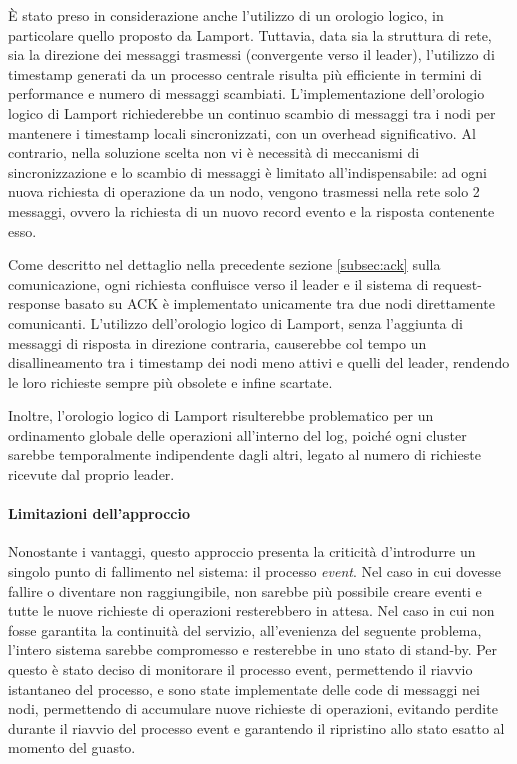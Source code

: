 \documentclass[12pt, a4paper]{report}
\begin{document}
\`E stato preso in considerazione anche l'utilizzo di un orologio logico, in particolare quello proposto da Lamport. Tuttavia, data sia la struttura di rete, sia la direzione dei messaggi trasmessi (convergente verso il leader), l'utilizzo di timestamp generati da un processo centrale risulta pi\`u efficiente in termini di performance e numero di messaggi scambiati. L'implementazione dell'orologio logico di Lamport richiederebbe un continuo scambio di messaggi tra i nodi per mantenere i timestamp locali sincronizzati, con un overhead significativo. Al contrario, nella soluzione scelta non vi \`e necessit\`a di meccanismi di sincronizzazione e lo scambio di messaggi \`e limitato all'indispensabile: ad ogni nuova richiesta di operazione da un nodo, vengono trasmessi nella rete solo 2 messaggi, ovvero la richiesta di un nuovo record evento e la risposta contenente esso.

Come descritto nel dettaglio nella precedente sezione \ref{subsec:ack} sulla comunicazione, ogni richiesta confluisce verso il leader e il sistema di request-response basato su ACK \`e implementato unicamente tra due nodi direttamente comunicanti. L'utilizzo dell'orologio logico di Lamport, senza l'aggiunta di messaggi di risposta in direzione contraria, causerebbe col tempo un disallineamento tra i timestamp dei nodi meno attivi e quelli del leader, rendendo le loro richieste sempre pi\`u obsolete e infine scartate.

Inoltre, l'orologio logico di Lamport risulterebbe problematico per un ordinamento globale delle operazioni all'interno del log, poiché ogni cluster sarebbe temporalmente indipendente dagli altri, legato al numero di richieste ricevute dal proprio leader.

\paragraph{Limitazioni dell'approccio}

Nonostante i vantaggi, questo approccio presenta la criticit\`a d'introdurre un singolo punto di fallimento nel sistema: il processo \textit{event}. Nel caso in cui dovesse fallire o diventare non raggiungibile, non sarebbe pi\`u possibile creare eventi e tutte le nuove richieste di operazioni resterebbero in attesa. Nel caso in cui non fosse garantita la continuit\`a del servizio, all'evenienza del seguente problema, l'intero sistema sarebbe compromesso e resterebbe in uno stato di stand-by. Per questo \`e stato deciso di monitorare il processo event, permettendo il riavvio istantaneo del processo, e sono state implementate delle code di messaggi nei nodi, permettendo di accumulare nuove richieste di operazioni, evitando perdite durante il riavvio del processo event e garantendo il ripristino allo stato esatto al momento del guasto.
\end{document}
